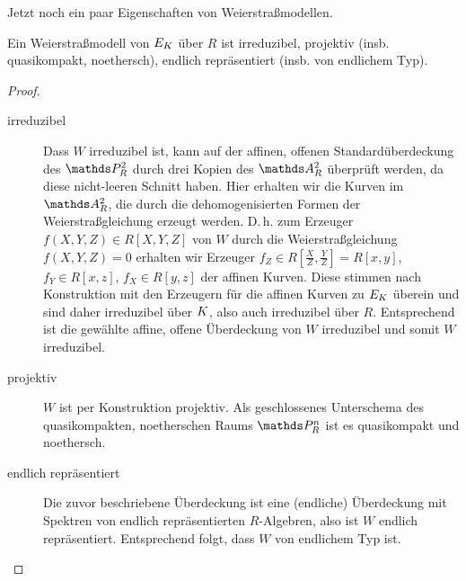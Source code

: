 \documentclass[german]{scrreprt}
\begin{document}
Jetzt noch ein paar Eigenschaften von Weierstraßmodellen.

\begin{Lemma}\label{thm:eigweierstrassmodelle}
  Ein Weierstraßmodell von $E_{K}$ über $R$ ist
  irreduzibel,
  projektiv (insb. quasikompakt, noethersch),
  endlich repräsentiert (insb. von endlichem Typ).
  \begin{proof}
    \begin{description}
    \item[irreduzibel]
      Dass $W$ irreduzibel ist, kann auf der affinen, offenen
      Standardüberdeckung des $\P_R^2$ durch drei Kopien des $\A_R^2$
      überprüft werden, da diese nicht-leeren Schnitt haben. Hier
      erhalten wir die Kurven im $\A_R^2$, die durch die
      dehomogenisierten Formen der Weierstraßgleichung erzeugt
      werden. D.\,h. zum Erzeuger $f(X,Y,Z)\in R[X,Y,Z]$ von $W$ durch 
      die Weierstraßgleichung $f(X,Y,Z)=0$  erhalten wir Erzeuger
      $f_Z\in R[\frac{X}{Z},\frac{Y}{Z}]=R[x,y]$, $f_Y\in R[x,z]$,
      $f_X\in R[y,z]$ der affinen Kurven.
      Diese stimmen nach Konstruktion mit den Erzeugern für die affinen
      Kurven zu $E_{K}$ überein und sind daher irreduzibel über $K$,
      also auch irreduzibel über $R$.
      Entsprechend ist die gewählte affine, offene Überdeckung von $W$
      irreduzibel und somit $W$ irreduzibel.
    \item[projektiv] $W$ ist per Konstruktion projektiv. Als
      geschlossenes Unterschema des quasikompakten, noetherschen Raums
      $\P_R^n$ ist es quasikompakt und noethersch.
    \item[endlich repräsentiert]
      Die zuvor beschriebene Überdeckung ist eine (endliche)
      Überdeckung mit Spektren von endlich repräsentierten $R$-Algebren,
      also ist $W$ endlich repräsentiert.
      Entsprechend folgt, dass $W$ von endlichem Typ ist.
    \end{description}
  \end{proof}
\end{Lemma}

\end{document}
